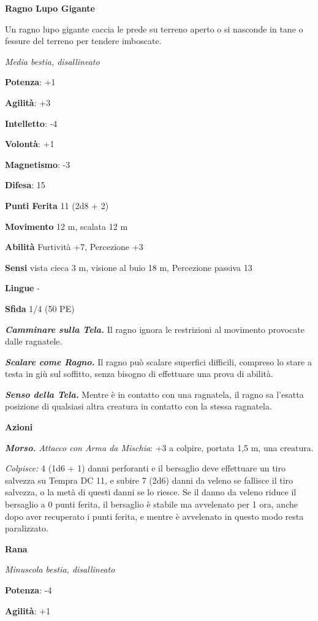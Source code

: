 \begin{multicols}{2}
\textbf{Ragno Lupo Gigante}

Un ragno lupo gigante caccia le prede su terreno aperto o si nasconde in
tane o fessure del terreno per tendere imboscate.

\emph{Media bestia, disallineato}

\textbf{Potenza}: +1

\textbf{Agilità}: +3

\textbf{Intelletto}: -4

\textbf{Volontà}: +1

\textbf{Magnetismo}: -3

\textbf{Difesa}: 15

\textbf{Punti Ferita} 11 (2d8 + 2)

\textbf{Movimento} 12 m, scalata 12 m

\textbf{Abilità} Furtività +7, Percezione +3

\textbf{Sensi} vista cieca 3 m, visione al buio 18 m, Percezione passiva
13

\textbf{Lingue} -

\textbf{Sfida} 1/4 (50 PE)

\emph{\textbf{Camminare sulla Tela.}} Il ragno ignora le restrizioni al
movimento provocate dalle ragnatele.

\emph{\textbf{Scalare come Ragno.}} Il ragno può scalare superfici
difficili, compreso lo stare a testa in giù sul soffitto, senza bisogno
di effettuare una prova di abilità.

\emph{\textbf{Senso della Tela.}} Mentre è in contatto con una
ragnatela, il ragno sa l'esatta posizione di qualsiasi altra creatura in
contatto con la stessa ragnatela.

\textbf{Azioni}

\emph{\textbf{Morso.} Attacco con Arma da Mischia}: +3 a colpire,
portata 1,5 m, una creatura.

\emph{Colpisce:} 4 (1d6 + 1) danni perforanti e il bersaglio deve
effettuare un tiro salvezza su Tempra DC 11, e subire 7 (2d6)
danni da veleno se fallisce il tiro salvezza, o la metà di questi danni
se lo riesce. Se il danno da veleno riduce il bersaglio a 0 punti
ferita, il bersaglio è stabile ma avvelenato per 1 ora, anche dopo aver
recuperato i punti ferita, e mentre è avvelenato in questo modo resta
paralizzato.

\textbf{Rana}

\emph{Minuscola bestia, disallineato}

\textbf{Potenza}: -4

\textbf{Agilità}: +1


\end{multicols}

